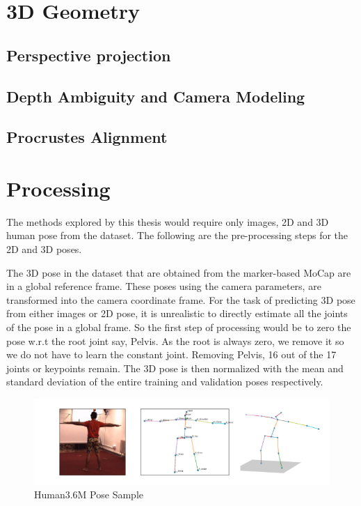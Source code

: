 \section{3D Geometry}
\lipsum[1-4] %
\subsection{Perspective projection}
\lipsum[1] %
\subsection{Depth Ambiguity and Camera Modeling}
\lipsum[1] %
\subsection{Procrustes Alignment}
\lipsum[1-4] %

\section{Processing}

The methods explored by this thesis would require only images, 2D and 3D human pose from the dataset. The following are the pre-processing steps for the 2D and 3D poses.

The 3D pose in the dataset that are obtained from the marker-based \ac{MoCap} are in a global reference frame. These poses using the camera parameters, are transformed into the camera coordinate frame. For the task of predicting 3D pose from either images or 2D pose, it is unrealistic to directly estimate all the joints of the pose in a global frame. So the first step of processing would be to zero the pose w.r.t the root joint say, Pelvis. As the root is always zero, we remove it so we do not have to learn the constant joint. Removing Pelvis, 16 out of the 17 joints or keypoints remain. The 3D pose is then normalized with the mean and standard deviation of the entire training and validation poses respectively.

\begin{figure}[h]
    \centering
    \includegraphics[width=\textwidth]{figures/h36poses.png}
    \caption{Human3.6M Pose Sample}
    \label{fig:h36_poses}
\end{figure}

